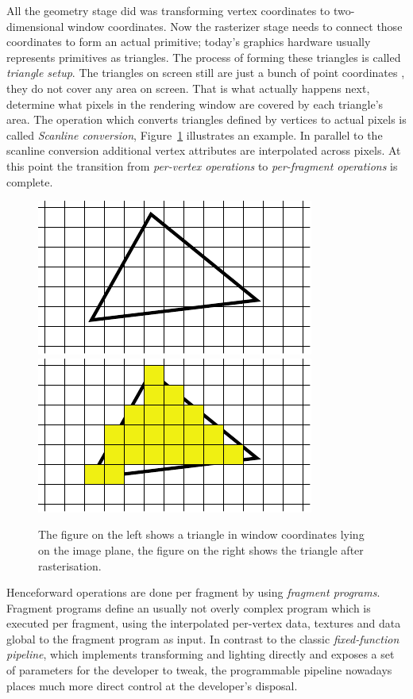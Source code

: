 All the geometry stage did was transforming vertex coordinates to
two-dimensional window coordinates. Now the rasterizer stage needs to connect
those coordinates to form an actual primitive; today's graphics hardware usually
represents primitives as triangles. The process of forming these triangles is
called \textit{triangle setup}. The triangles on screen still are just a bunch
of point coordinates , they do not cover any area on screen. That is what
actually happens next, determine what pixels in the rendering window are covered
by each triangle's area. The operation which converts triangles defined by
vertices to actual pixels is called \textit{Scanline conversion},
Figure~\ref{fig:rasteriser} illustrates an example. In parallel to the scanline
conversion additional vertex attributes are interpolated across pixels. At this
point the transition from \textit{per-vertex operations} to \textit{per-fragment
operations} is complete.
\begin{figure}[b]
\centering
\subfigure
{
  \includegraphics[scale=1.0]{Images/Rasteriser1.pdf}
  \label{fig:subfigrasteriser1}
}
\subfigure
{
  \includegraphics[scale=1.0]{Images/Rasteriser2.pdf}
  \label{fig:subfigrasteriser2}
}
\caption[Triangle Rasterisation]{The figure on the left shows a triangle in
window coordinates lying on the image plane, the figure on the right shows the
triangle after rasterisation.}
\label{fig:rasteriser}
\end{figure}

Henceforward operations are done per fragment by using \textit{fragment
programs}. Fragment programs define an usually not overly complex program which
is executed per fragment, using the interpolated per-vertex data, textures and
data global to the fragment program as input. In contrast to the classic
\textit{fixed-function pipeline}, which implements transforming and lighting
directly and exposes a set of parameters for the developer to tweak, the
programmable pipeline nowadays places much more direct control at the
developer's disposal.

